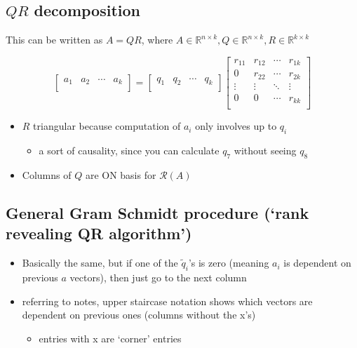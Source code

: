 \documentclass[10pt,letterpaper]{article}
\begin{document}
\subsection{$QR$ decomposition}
\label{sec-3_5}

This can be written as $A=QR$, where $A \in \mathbb{R}^{n \times k}, Q \in \mathbb{R}^{n \times k} , R \in \mathbb{R}^{k\times k}$

\[
\begin{bmatrix}
  a_1 & a_2 & \cdots & a_k \\
\end{bmatrix}
=
\begin{bmatrix}
  q_1 & q_2 & \cdots & q_k \\
\end{bmatrix}
\begin{bmatrix}
  r_{11} & r_{12} & \cdots & r_{1k} \\
         0 & r_{22} & \cdots & r_{2k} \\
    \vdots & \vdots   & \ddots & \vdots   \\
         0 & 0        & \cdots & r_{kk} \\
\end{bmatrix}
\]
\begin{itemize}
\item $R$ triangular because computation of $a_i$ only involves up to $q_i$

\begin{itemize}
\item a sort of causality, since you can calculate $q_7$ without seeing $q_8$
\end{itemize}

\item Columns of $Q$ are ON basis for $\mathcal{R}(A)$
\end{itemize}
\subsection{General Gram Schmidt procedure (`rank revealing QR algorithm')}
\label{sec-3_6}

\begin{itemize}
\item Basically the same, but if one of the $\tilde q_i$'s is zero (meaning $a_i$ is dependent on previous $a$ vectors), then just go to the next column
\item referring to notes, upper staircase notation shows which vectors are dependent on previous ones (columns without the x's)

\begin{itemize}
\item entries with x are `corner' entries
\end{itemize}

\end{itemize}
\end{document}
